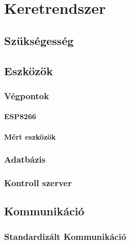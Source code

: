\chapter{Keretrendszer}

\section{Szükségesség}

\section{Eszközök}

\subsection{Végpontok}

\subsubsection{ESP8266}

\subsubsection{Mért eszközök}

\subsection{Adatbázis}

\subsection{Kontroll szerver}

\section{Kommunikáció}

\subsection{Standardizált Kommunikáció}

